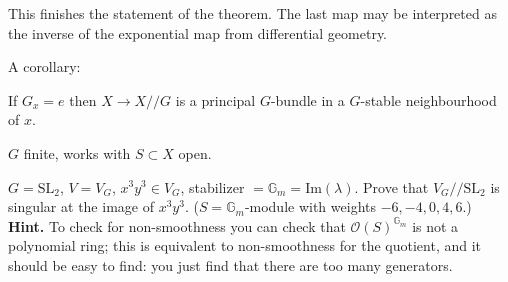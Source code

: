 This finishes the statement of the theorem. The last map may be interpreted as
the inverse of the exponential map from differential geometry.

A corollary:

\begin{lemma}
\label{lemma-}
If $G_x=e$ then $X \to X/\!/G$ is a principal $G$-bundle in a $G$-stable
neighbourhood of $x$.
\end{lemma}

\begin{exercise}
\label{exercise-also-works-for-G-finite-and-S-open}
$G$ finite, works with $S\subset X$ open.
\end{exercise}

\begin{exercise}
\label{exercise-}
$G=\text{SL}_2$, $V=V_G$, $x^3y^3 \in V_G$, stabilizer
$=\mathbb{G}_m=\text{Im}(\lambda)$. Prove that $V_G/\!/\text{SL}_2$ is singular at
the image of $x^3y^3$. ($S=\mathbb{G}_m$-module with weights $-6,-4,0,4,6$.)
{\bf Hint.} To
check for non-smoothness you can check that $\mathcal{O}(S)^{\mathbb{G}_m}$ is
not a polynomial ring; this is equivalent to non-smoothness for the quotient,
and it should be easy to find: you just find that there are too many generators.
\end{exercise}





